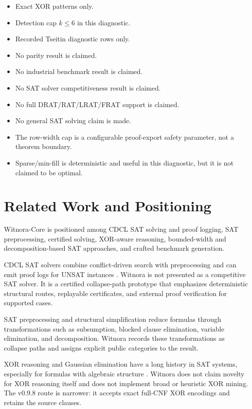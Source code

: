 \documentclass[10pt]{article}
\begin{document}
\begin{itemize}
  \item Exact XOR patterns only.
  \item Detection cap \(k \leq 6\) in this diagnostic.
  \item Recorded Tseitin diagnostic rows only.
  \item No parity result is claimed.
  \item No industrial benchmark result is claimed.
  \item No SAT solver competitiveness result is claimed.
  \item No full DRAT/RAT/LRAT/FRAT support is claimed.
  \item No general SAT solving claim is made.
  \item The row-width cap is a configurable proof-export safety parameter, not
  a theorem boundary.
  \item Sparse/min-fill is deterministic and useful in this diagnostic, but it
  is not claimed to be optimal.
\end{itemize}

\section{Related Work and Positioning}

Witnora-Core is positioned among CDCL SAT solving and proof logging, SAT
preprocessing, certified solving, XOR-aware reasoning, bounded-width and
decomposition-based SAT approaches, and crafted benchmark generation.

CDCL SAT solvers combine conflict-driven search with preprocessing and can emit
proof logs for UNSAT instances
\cite{marques1999grasp,bayardo1997lookback,moskewicz2001chaff,een2003minisat,biere2009handbook}.
Witnora is not presented as a competitive SAT solver. It is a certified
collapse-path prototype that emphasizes deterministic structural routes,
replayable certificates, and external proof verification for supported cases.

SAT preprocessing and structural simplification reduce formulas through
transformations such as subsumption, blocked clause elimination, variable
elimination, and decomposition. Witnora records these transformations as
collapse paths and assigns explicit public categories to the result.

XOR reasoning and Gaussian elimination have a long history in SAT systems,
especially for formulas with algebraic structure \cite{soos2009cryptographic}.
Witnora does not claim novelty for XOR reasoning itself and does not implement
broad or heuristic XOR mining. The v0.9.8 route is narrower: it accepts exact
full-CNF XOR encodings and retains the source clauses.
\end{document}
